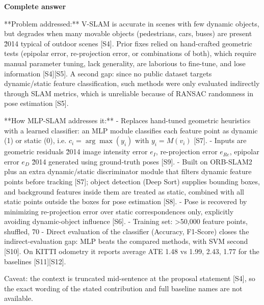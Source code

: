 \documentclass[10pt]{article}
\begin{document}
\textbf{Complete answer}
\begin{AnswerText}
**Problem addressed:** V-SLAM is accurate in scenes with few dynamic objects, but degrades when many movable objects (pedestrians, cars, buses) are present \u2014 typical of outdoor scenes [S4]. Prior fixes relied on hand-crafted geometric tests (epipolar error, re-projection error, or combinations of both), which require manual parameter tuning, lack generality, are laborious to fine-tune, and lose information [S4][S5]. A second gap: since no public dataset targets dynamic/static feature classification, such methods were only evaluated indirectly through SLAM metrics, which is unreliable because of RANSAC randomness in pose estimation [S5].

**How MLP-SLAM addresses it:**
- Replaces hand-tuned geometric heuristics with a learned classifier: an MLP module classifies each feature point as dynamic (1) or static (0), i.e. $c_i = \arg\max(y_i)$ with $y_i = M(v_i)$ [S7].
- Inputs are geometric residuals \u2014 image intensity error $e_I$, re-projection error $e_{Re}$, epipolar error $e_D$ \u2014 generated using ground-truth poses [S9].
- Built on ORB-SLAM2 plus an extra dynamic/static discriminator module that filters dynamic feature points before tracking [S7]; object detection (Deep Sort) supplies bounding boxes, and background features inside them are treated as static, combined with all static points outside the boxes for pose estimation [S8].
- Pose is recovered by minimizing re-projection error over static correspondences only, explicitly avoiding dynamic-object influence [S6].
- Training set: >50,000 feature points, shuffled, 70%
- Direct evaluation of the classifier (Accuracy, F1-Score) closes the indirect-evaluation gap: MLP beats the compared methods, with SVM second [S10]. On KITTI odometry it reports average ATE 1.48 vs 1.99, 2.43, 1.77 for the baselines [S11][S12].

Caveat: the context is truncated mid-sentence at the proposal statement [S4], so the exact wording of the stated contribution and full baseline names are not available.
\end{AnswerText}
\end{document}
